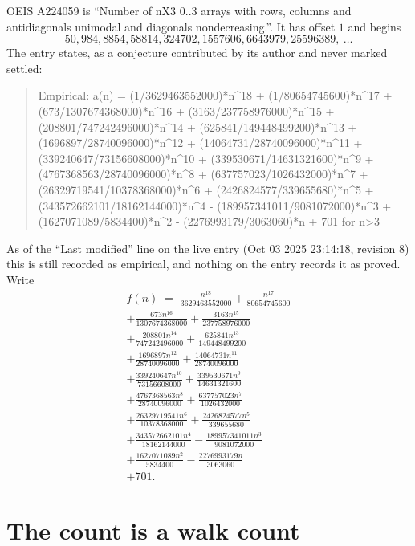 \documentclass[11pt,a4paper]{article}
\theoremstyle{plain}
\theoremstyle{definition}
\begin{document}
OEIS A224059 is ``Number of nX3 0..3 arrays with rows, columns and antidiagonals unimodal and diagonals nondecreasing.''. It has offset $1$ and begins
\[
50, 984, 8854, 58814, 324702, 1557606, 6643979, 25596389,\ \dots
\]
The entry states, as a conjecture contributed by its author and never marked settled:
\begin{quote}\raggedright\small
Empirical: a(n) = (1/3629463552000)*n\^{}18 + (1/80654745600)*n\^{}17 + (673/1307674368000)*n\^{}16 + (3163/237758976000)*n\^{}15 + (208801/747242496000)*n\^{}14 + (625841/149448499200)*n\^{}13 + (1696897/28740096000)*n\^{}12 + (14064731/28740096000)*n\^{}11 + (339240647/73156608000)*n\^{}10 + (339530671/14631321600)*n\^{}9 + (4767368563/28740096000)*n\^{}8 + (637757023/1026432000)*n\^{}7 + (26329719541/10378368000)*n\^{}6 + (2426824577/339655680)*n\^{}5 + (343572662101/18162144000)*n\^{}4 - (189957341011/9081072000)*n\^{}3 + (1627071089/5834400)*n\^{}2 - (2276993179/3063060)*n + 701 for n>3
\end{quote}
As of the ``Last modified'' line on the live entry (Oct 03 2025 23:14:18, revision 8) this is still
recorded as empirical, and nothing on the entry records it as proved. Write
\begin{multline*}
f(n)\;=\;\frac{n^{18}}{3629463552000} + \frac{n^{17}}{80654745600} \\
+ \frac{673 n^{16}}{1307674368000} + \frac{3163 n^{15}}{237758976000} \\
+ \frac{208801 n^{14}}{747242496000} + \frac{625841 n^{13}}{149448499200} \\
+ \frac{1696897 n^{12}}{28740096000} + \frac{14064731 n^{11}}{28740096000} \\
+ \frac{339240647 n^{10}}{73156608000} + \frac{339530671 n^{9}}{14631321600} \\
+ \frac{4767368563 n^{8}}{28740096000} + \frac{637757023 n^{7}}{1026432000} \\
+ \frac{26329719541 n^{6}}{10378368000} + \frac{2426824577 n^{5}}{339655680} \\
+ \frac{343572662101 n^{4}}{18162144000} - \frac{189957341011 n^{3}}{9081072000} \\
+ \frac{1627071089 n^{2}}{5834400} - \frac{2276993179 n}{3063060} \\
+ 701.
\end{multline*}

\section{The count is a walk count}
\end{document}
